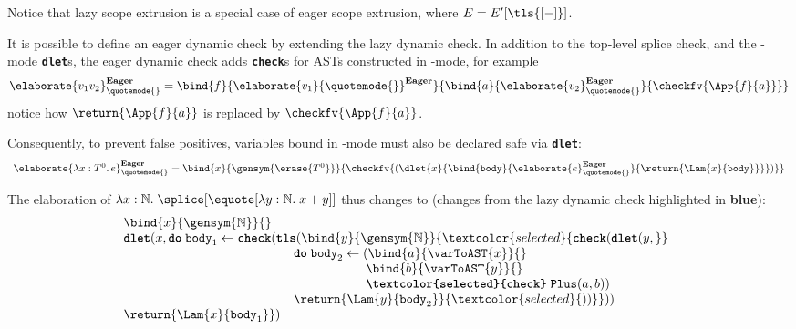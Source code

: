 Notice that lazy scope extrusion is a special case of eager scope extrusion, where $E = E'[\tls{[-]}]$. 

It is possible to define an eager dynamic check by extending the lazy dynamic check. In addition to the top-level splice check, and the \compilemode{}-mode \textbf{\texttt{dlet}}s, the eager dynamic check adds \textbf{\texttt{check}}s for ASTs constructed in \quotemode{}-mode, for example 
\[\elaborate{v_1 v_2}_{\quotemode{}}^{\textbf{Eager}} = \bind{f}{\elaborate{v_1}{\quotemode{}}^{\textbf{Eager}}}{\bind{a}{\elaborate{v_2}_{\quotemode{}}^{\textbf{Eager}}}{\checkfv{\App{f}{a}}}}\]
notice how $\return{\App{f}{a}}$ is replaced by $\checkfv{\App{f}{a}}$. 

Consequently, to prevent false positives, variables bound in \quotemode{}-mode must also be declared safe via \textbf{\texttt{dlet}}:
{
  \footnotesize
\[
\begin{array}{rcl}
\elaborate{\lambda x: T^0. \, e}_{\quotemode{}}^{\textbf{Eager}} = \bind{x}{\gensym{\erase{T^0}}}{\checkfv{(\dlet{x}{\bind{\texttt{body}}{\elaborate{e}_{\quotemode{}}^\textbf{Eager}}{\return{\Lam{x}{\texttt{body}}}}})}}
\end{array}\]
}

The elaboration of $\lambda x:\mathbb{N}. \; \splice[{\equote[\lambda{y}: \mathbb{N}. \; x+y]}]$ thus changes to (changes from the lazy dynamic check highlighted in \textbf{\textcolor{selected}{blue}}):
{
\[\begin{array}{@{}l}
  \bind{x}{\gensym{\mathbb{N}}}{} \\
  {\textbf{\texttt{dlet}}(}{x}, \textbf{\texttt{do}} \; {\texttt{body}_1} \leftarrow {\textbf{\texttt{check}}(}\textbf{\texttt{tls}}({\bind{y}{\gensym{\mathbb{N}}}{\textcolor{selected}{\textbf{\texttt{check}}(\textbf{\texttt{dlet}}(y,}}} \\
    \quad\quad\quad\quad\quad\quad\quad
    \quad\quad\quad\quad\quad\quad\,\,
    \textbf{\texttt{do}}\;{\texttt{body}_2} \leftarrow {(\bind{a}{\varToAST{x}}{}}\\
    \quad\quad\quad\quad\quad\quad\quad\quad
    \quad\quad\quad\quad\quad\quad\quad\quad
    \quad\quad\quad
    \bind{b}{\varToAST{y}}{}\\
    \quad\quad\quad\quad\quad\quad\quad\quad
    \quad\quad\quad\quad\quad\quad\quad\quad
    \quad\quad\quad
    \textbf{\texttt{\textcolor{selected}{check}}}\;{\texttt{Plus}(a, b)})\\
    \quad\quad\quad\quad\quad\quad\quad
    \quad\quad\quad\quad\quad\quad\,\,
    \return{\Lam{y}{\texttt{body}_2}}{\textcolor{selected}{))}}))\\
  {\return{\Lam{x}{\texttt{body}_1}}})
\end{array}\]
}

